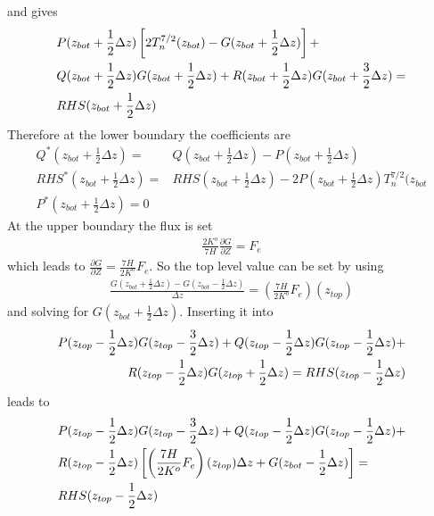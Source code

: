 %
and gives
%
\begin{align}
  {} & P(z_{bot}+\frac{1}{2} \Delta z)\left[ 2 T_n^{7/2}(z_{bot}) - G(z_{bot}+\frac{1}{2}\Delta z) \right]  +
   \notag \\
  {}& Q(z_{bot}+\frac{1}{2} \Delta z)
  G(z_{bot}+\frac{1}{2} \Delta z) + R(z_{bot}+\frac{1}{2} \Delta z) G(z_{bot}+\frac{3}{2} \Delta z) = \\
  {} & RHS(z_{bot}+\frac{1}{2} \Delta z) \notag \label{settei:eq_trisolv}
\end{align}
%
Therefore at the lower boundary the coefficients are
%
\begin{align}
  Q^*(z_{bot}+\frac{1}{2} \Delta z) = & Q(z_{bot}+\frac{1}{2} \Delta z) - P(z_{bot}+\frac{1}{2} \Delta z)\\
  RHS^*(z_{bot}+\frac{1}{2} \Delta z) = & RHS(z_{bot}+\frac{1}{2} \Delta z) -
         2P(z_{bot}+\frac{1}{2} \Delta z) T_n^{7/2}(z_{bot} \\
  P^*(z_{bot}+\frac{1}{2} \Delta z) = 0
\end{align}
%
At the upper boundary the flux is set
%
\begin{align}
  \frac{2 K^o}{7 H} \frac{\partial G}{\partial Z} = F_e
\end{align}
%
which leads to $\frac{\partial G}{\partial Z} = \frac{7H}{2 K^o} F_e$.
So the top level value can be set by using
%
\begin{align}
   \frac{G(z_{bot}+\frac{1}{2} \Delta z)-G(z_{bot}-\frac{1}{2} \Delta z)}{\Delta z} =
   \left( \frac{7H}{2 K^o} F_e \right) (z_{top})
\end{align}
%
and solving for $G(z_{bot}+\frac{1}{2} \Delta z)$. Inserting it into
%
\begin{align}
  P(z_{top}-\frac{1}{2} \Delta z) G(z_{top}-\frac{3}{2} \Delta z) +
  Q(z_{top}-\frac{1}{2} \Delta z)
  G(z_{top}-\frac{1}{2} \Delta z) + \notag \\
  R(z_{top}-\frac{1}{2} \Delta z) G(z_{top}+\frac{1}{2} \Delta z) =
  RHS(z_{top}-\frac{1}{2} \Delta z)
\end{align}
%
leads to
%
\begin{align}
  {} &  P(z_{top}-\frac{1}{2} \Delta z) G(z_{top}-\frac{3}{2} \Delta z) +
  Q(z_{top}-\frac{1}{2} \Delta z)
  G(z_{top}-\frac{1}{2} \Delta z) + \notag \\
  {} & R(z_{top}-\frac{1}{2} \Delta z) \left[
   \left( \frac{7H}{2 K^o} F_e \right) (z_{top}) \Delta z  + G(z_{bot}-\frac{1}{2} \Delta z) \right] = \\
  {} & RHS(z_{top}-\frac{1}{2} \Delta z) \notag
\end{align}
